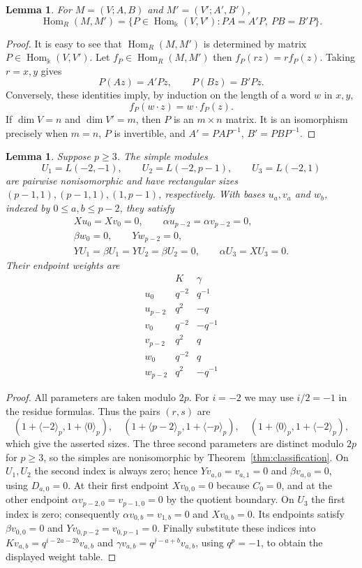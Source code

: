 \documentclass[10pt,oneside]{amsart}
\newcommand{\kk}{\Bbbk}
\newcommand{\res}[1]{\langle #1\rangle_p}
\newtheorem{lemma}[proposition]{Lemma}
\theoremstyle{definition}
\begin{document}
\begin{lemma}\label{lem:free-pair-hom}
For $M=(V;A,B)$ and $M'=(V';A',B')$,
\[
 \operatorname{Hom}_R(M,M')
 =\{P\in\operatorname{Hom}_{\kk}(V,V'):PA=A'P,\ PB=B'P\}.
\]
\end{lemma}
\begin{proof} It is easy to see that $\operatorname{Hom}_R(M,M')$ is determined by matrix $P \in \operatorname{Hom}_{\kk}(V,V')$.
Let $f_{P}\in \operatorname{Hom}_R(M,M')$ then $f_P(rz)=rf_P(z)$. Taking $r=x,y$ gives
\[P(Az)=A'Pz,\qquad P(Bz)=B'Pz.\]
Conversely, these identities imply,
by induction on the length of a word $w$ in $x,y$,
\[
 f_P(w\cdot z)=w\cdot f_P(z).
\]
If $\dim V=n$ and $\dim V'=m$, then $P$ is an $m\times n$ matrix.
It is an isomorphism precisely when $m=n$, $P$ is invertible, and
$A'=PAP^{-1}$, $B'=PBP^{-1}$.
\end{proof}

\begin{lemma}\label{lem:wild-simple-endpoints}
Suppose $p\ge3$. The simple modules
\[
 U_1=L(-2,-1),\qquad U_2=L(-2,p-1),\qquad U_3=L(-2,1)
\]
are pairwise nonisomorphic and have rectangular sizes
$(p-1,1),(p-1,1),(1,p-1)$, respectively. With bases
$u_a,v_a$ and $w_b$, indexed by $0\le a,b\le p-2$, they satisfy
\begin{gather*}
 Xu_0=Xv_0=0,\qquad \alpha u_{p-2}=\alpha v_{p-2}=0,\\
 \beta w_0=0,\qquad Yw_{p-2}=0,\\
 YU_1=\beta U_1=YU_2=\beta U_2=0,\qquad \alpha U_3=XU_3=0.
\end{gather*}
Their endpoint weights are
\[
\begin{array}{c|cc}
 &K&\gamma\\\hline
 u_0&q^{-2}&q^{-1}\\
 u_{p-2}&q^2&-q\\
 v_0&q^{-2}&-q^{-1}\\
 v_{p-2}&q^2&q\\
 w_0&q^{-2}&q\\
 w_{p-2}&q^2&-q^{-1}
\end{array}
\]
\end{lemma}
\begin{proof}
All parameters are taken modulo $2p$. For $i=-2$ we may use $i/2=-1$
in the residue formulas. Thus the pairs $(r,s)$ are
\[
 (1+\res{-2},1+\res{0}),\quad
 (1+\res{p-2},1+\res{-p}),\quad
 (1+\res{0},1+\res{-2}),
\]
which give the asserted sizes. The three second parameters are distinct
modulo $2p$ for $p\ge3$, so the simples are nonisomorphic by
Theorem~\ref{thm:classification}.
On $U_1,U_2$ the second index is always zero; hence
$Yv_{a,0}=v_{a,1}=0$ and $\beta v_{a,0}=0$, using $D_{a,0}=0$.
At their first endpoint $Xv_{0,0}=0$ because $C_0=0$, and at the
other endpoint $\alpha v_{p-2,0}=v_{p-1,0}=0$ by the quotient boundary.
On $U_3$ the first index is zero; consequently
$\alpha v_{0,b}=v_{1,b}=0$ and $Xv_{0,b}=0$.
Its endpoints satisfy $\beta v_{0,0}=0$ and
$Yv_{0,p-2}=v_{0,p-1}=0$.
Finally substitute these indices into
$Kv_{a,b}=q^{i-2a-2b}v_{a,b}$ and
$\gamma v_{a,b}=q^{j-a+b}v_{a,b}$, using $q^p=-1$,
to obtain the displayed weight table.
\end{proof}
\end{document}

